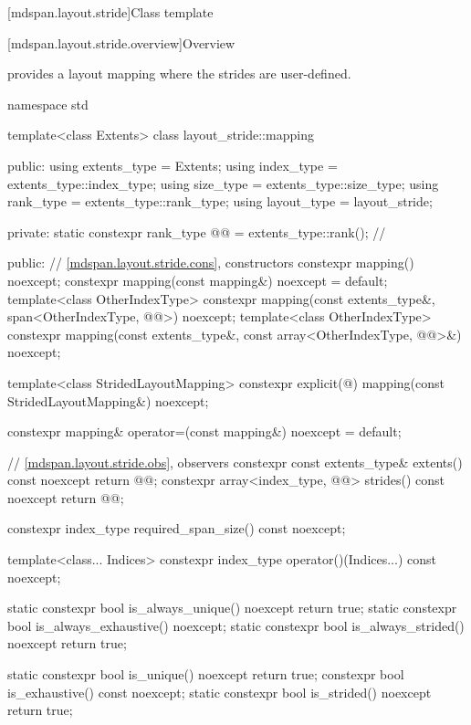 [mdspan.layout.stride]{Class template }

[mdspan.layout.stride.overview]{Overview}

\pnum
{} provides a layout mapping
where the strides are user-defined.

\begin{codeblock}
namespace std {
  template<class Extents>
  class layout_stride::mapping {
  public:
    using extents_type = Extents;
    using index_type = extents_type::index_type;
    using size_type = extents_type::size_type;
    using rank_type = extents_type::rank_type;
    using layout_type = layout_stride;

  private:
    static constexpr rank_type @@ = extents_type::rank();    // \expos

  public:
    // \ref{mdspan.layout.stride.cons}, constructors
    constexpr mapping() noexcept;
    constexpr mapping(const mapping&) noexcept = default;
    template<class OtherIndexType>
      constexpr mapping(const extents_type&, span<OtherIndexType, @@>) noexcept;
    template<class OtherIndexType>
      constexpr mapping(const extents_type&, const array<OtherIndexType, @@>&) noexcept;

    template<class StridedLayoutMapping>
      constexpr explicit(@\seebelow@) mapping(const StridedLayoutMapping&) noexcept;

    constexpr mapping& operator=(const mapping&) noexcept = default;

    // \ref{mdspan.layout.stride.obs}, observers
    constexpr const extents_type& extents() const noexcept { return @@; }
    constexpr array<index_type, @@> strides() const noexcept { return @@; }

    constexpr index_type required_span_size() const noexcept;

    template<class... Indices>
      constexpr index_type operator()(Indices...) const noexcept;

    static constexpr bool is_always_unique() noexcept { return true; }
    static constexpr bool is_always_exhaustive() noexcept;
    static constexpr bool is_always_strided() noexcept { return true; }

    static constexpr bool is_unique() noexcept { return true; }
    constexpr bool is_exhaustive() const noexcept;
    static constexpr bool is_strided() noexcept { return true; }

}}
\end{codeblock}
